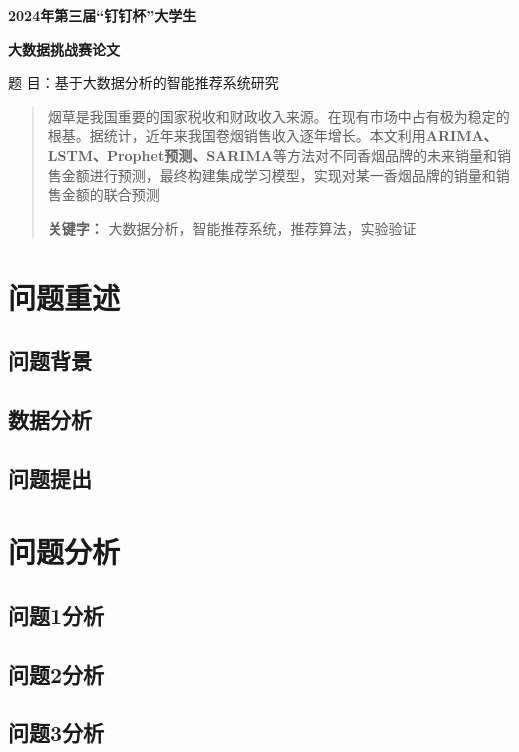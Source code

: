 \documentclass{article}
\begin{document}
  
	
	\begin{center}  
		\fontsize{16pt}{19pt}\selectfont \textbf{2024年第三届“钉钉杯”大学生}  
		
		\fontsize{16pt}{19pt}\selectfont  
		\textbf{大数据挑战赛论文}  
		
		\centering  
		题 目：基于大数据分析的智能推荐系统研究  
	\end{center}  
	
	\begin{abstract}  
		烟草是我国重要的国家税收和财政收入来源。在现有市场中占有极为稳定的根基。据统计，近年来我国卷烟销售收入逐年增长。本文利用\textbf{ARIMA、LSTM、Prophet预测、SARIMA}等方法对不同香烟品牌的未来销量和销售金额进行预测，最终构建集成学习模型，实现对某一香烟品牌的销量和销售金额的联合预测
		
		\textbf{关键字：} 大数据分析，智能推荐系统，推荐算法，实验验证  
	\end{abstract}  
	\newpage  
	
	\tableofcontents  
	\newpage 
	
	\pagestyle{mainmatter}
	\setcounter{page}{1}
	\section{问题重述}
	\subsection{问题背景}
	\subsection{数据分析}
	\subsection{问题提出}  
	\section{问题分析}  
	\subsection{问题1分析}
	\subsection{问题2分析}
	\subsection{问题3分析}
\end{document}
